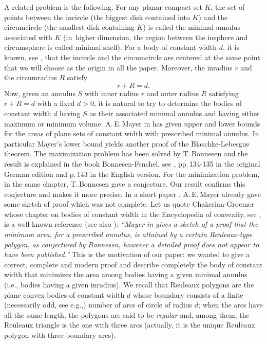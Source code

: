 \documentclass[11pt]{article}
\newcommand{\ie}{i.e.,\xspace}
\newcommand{\eg}{e.g.,\xspace}
\numberwithin{equation}{section}
\theoremstyle{plain}
\theoremstyle{definition}
\begin{document}
A related problem is the following.
For any planar compact set $K$, the set of points between the incircle (the biggest disk contained into $K$) and the circumcircle (the smallest disk containing $K$) is
called the minimal {annulus} associated with $K$ {(in~higher dimension, the region between the insphere and circumsphere is called minimal shell).}
For a body of constant width $d$, it is known, see \cite{CG}, that the {incircle} and the {circumcircle} are centered at the
same point that we will choose as the origin in all the paper. Moreover, the inradius $r$ and the circumradius $R$
satisfy\vspace*{-3pt}%
\begin{equation}\label{inr}
r+R=d.
\end{equation}
Now, given an annulus $S$ with inner radius $r$ and outer radius $R$ satisfying $r+R=d$
with a fixed $d > 0$, it is natural to try to determine the bodies of
constant width $d$ having $S$ as their
associated minimal annulus and having either maximum or minimum volume.
A.\,E.\,Mayer in \cite{Ma1} has given upper
and lower bounds for the areas of plane sets of constant width with prescribed
minimal annulus. In particular Mayer's lower bound
yields another proof of the Blaschke-Lebesgue
theorem.
The maximization problem has been solved by T.\,Bonnesen and the result is explained in the book
Bonnesen-Fenchel, see \cite{BF}, pp.\,134-135 in the original German edition and p.\,143
in the English version.
For the minimization problem, in the same chapter, T.\,Bonnesen gave a conjecture.
Our result confirms this conjecture and makes it more precise. In a short paper
\cite{Ma2}, A.\,E.\,Mayer {already} gave some sketch of proof which was not complete.
Let us quote Chakerian-Groemer whose chapter on bodies of constant width in the Encyclopedia
of convexity, see \cite{CG}, is a well-known reference (see also \cite{MMO}):
\emph{``Mayer in \cite{Ma2} gives a sketch of a proof that the minimum
area, for a prescribed annulus, is attained by a certain Reuleaux-type polygon, as
conjectured by Bonnesen, however a detailed proof does not appear to have been
published.''}
This is the motivation of our paper: we wanted to give a correct, complete and modern proof
and describe completely the body of constant width that minimizes the area among bodies
having a given minimal annulus (\ie bodies having a given inradius).
We recall that Reuleaux polygons are the plane convex bodies of constant width $d$ whose boundary consists of a finite (necessarily odd, see \eg \cite[\S 8.1]{MMO}) number of arcs of circle of radius $d$; when the arcs have all the
same length, the polygons are said to be \emph{regular} and, among them, the Reuleaux triangle is the one with three arcs (actually, it is the unique Reuleaux polygon with three boundary arcs).
\end{document}
